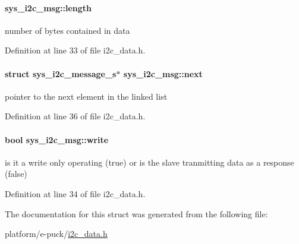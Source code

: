 \paragraph[{length}]{ sys\+\_\+i2c\+\_\+msg\+::length}\label{structsys__i2c__msg_a92073f759594ee543835f8ad73031e11}
number of bytes contained in data 

Definition at line 33 of file i2c\+\_\+data.\+h.

\hypertarget{structsys__i2c__msg_af32e596f9bfb62fb8cb06d996c1573d2}{}
\paragraph[{next}]{\setlength{\rightskip}{0pt plus 5cm}struct sys\+\_\+i2c\+\_\+message\+\_\+s$\ast$ sys\+\_\+i2c\+\_\+msg\+::next}\label{structsys__i2c__msg_af32e596f9bfb62fb8cb06d996c1573d2}
pointer to the next element in the linked list 

Definition at line 36 of file i2c\+\_\+data.\+h.

\hypertarget{structsys__i2c__msg_ac4d2c8d778512502b11f6ec055b2daf5}{}
\paragraph[{write}]{\setlength{\rightskip}{0pt plus 5cm}bool sys\+\_\+i2c\+\_\+msg\+::write}\label{structsys__i2c__msg_ac4d2c8d778512502b11f6ec055b2daf5}
is it a write only operating (true) or is the slave tranmitting data as a response (false) 

Definition at line 34 of file i2c\+\_\+data.\+h.



The documentation for this struct was generated from the following file\+:\begin{DoxyCompactItemize}
\item 
platform/e-\/puck/\hyperlink{i2c__data_8h}{i2c\+\_\+data.\+h}\end{DoxyCompactItemize}
